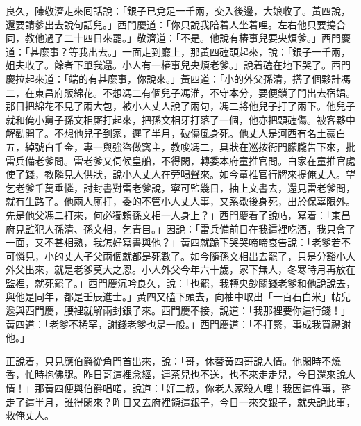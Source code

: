 良久，陳敬濟走來囘話說：「銀子已兌足一千兩，交入後邊，大娘收了。黃四說，還要請爹出去說句話兒。」西門慶道：「你只說我陪着人坐着哩。左右他只要搗合同，教他過了二十四日來罷。」敬濟道：「不是。他說有樁事兒要央煩爹。」西門慶道：「甚麼事？等我出去。」一面走到廳上，那黃四磕頭起來，說：「銀子一千兩，姐夫收了。餘者下單我還。小人有一樁事兒央煩老爹。」說着磕在地下哭了。西門慶拉起來道：「端的有甚麼事，你說來。」黃四道：「小的外父孫清，搭了個夥計馮二，在東昌府販綿花。不想馮二有個兒子馮淮，不守本分，要便鎖了門出去宿娼。那日把綿花不見了兩大包，被小人丈人說了兩句，馮二將他兒子打了兩下。他兒子就和俺小舅子孫文相厮打起來，把孫文相牙打落了一個，他亦把頭磕傷。被客夥中解勸開了。不想他兒子到家，遲了半月，破傷風身死。他丈人是河西有名土豪白五，綽號白千金，專一與強盜做窩主，教唆馮二，具狀在巡按衙門朦朧告下來，批雷兵備老爹問。雷老爹又伺候皇船，不得閑，轉委本府童推官問。白家在童推官處使了錢，教隣見人供狀，說小人丈人在旁喝聲來。如今童推官行牌來提俺丈人。望乞老爹千萬垂憐，討封書對雷老爹說，寧可監幾日，抽上文書去，還見雷老爹問，就有生路了。他兩人厮打，委的不管小人丈人事，又系歇後身死，出於保辜限外。先是他父馮二打來，何必獨賴孫文相一人身上？」西門慶看了說帖，寫着：「東昌府見監犯人孫清、孫文相，乞青目。」因說：「雷兵備前日在我這裡吃酒，我只會了一面，又不甚相熟，我怎好寫書與他？」黃四就跪下哭哭啼啼哀告說：「老爹若不可憐見，小的丈人子父兩個就都是死數了。如今隨孫文相出去罷了，只是分豁小人外父出來，就是老爹莫大之恩。小人外父今年六十歲，家下無人，冬寒時月再放在監裡，就死罷了。」西門慶沉吟良久，說：「也罷，我轉央鈔關錢老爹和他說說去，與他是同年，都是壬辰進士。」黃四又磕下頭去，向袖中取出「一百石白米」帖兒遞與西門慶，腰裡就解兩封銀子來。西門慶不接，說道：「我那裡要你這行錢！」黃四道：「老爹不稀罕，謝錢老爹也是一般。」西門慶道：「不打緊，事成我買禮謝他。」

正說着，只見應伯爵從角門首出來，說：「哥，休替黃四哥說人情。他閑時不燒香，忙時抱佛腿。{}昨日哥這裡念經，連茶兒也不送，也不來走走兒，今日還來說人情！」那黃四便與伯爵唱喏，說道：「好二叔，你老人家殺人哩！{}我因這件事，整走了這半月，誰得閑來？昨日又去府裡領這銀子，今日一來交銀子，就央說此事，救俺丈人。

